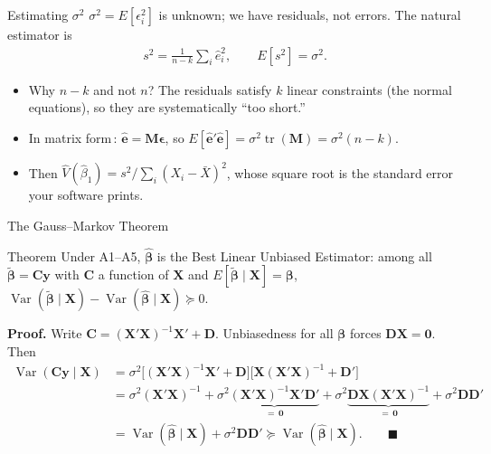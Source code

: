 \documentclass[aspectratio=169,11pt,xcolor=dvipsnames]{beamer}
\DeclareMathOperator{\Var}{Var}
\DeclareMathOperator{\trace}{tr}
\newcommand{\E}{E}
\newcommand{\X}{\bm{X}}
\newcommand{\Y}{\bm{y}}
\newcommand{\zero}{\bm{0}}
\newcommand{\Mm}{\bm{M}}
\newcommand{\bhat}{\hat{\bm{\beta}}}
\newcommand{\ehat}{\hat{\bm{e}}}
\newcommand{\adv}{\,\raisebox{0.6pt}{\textcolor{accent}{$\bigstar$}}}
\begin{document}
\begin{frame}{Estimating $\sigma^2$}
$\sigma^2 = \E[\epsilon_i^2]$ is unknown; we have residuals, not errors. The
natural estimator is
\begin{align*}
  s^2 = \frac{1}{n-k}\sum_i \hat e_i^2 ,
  \qquad \E[s^2] = \sigma^2 .
\end{align*}
\begin{itemize}\itemsep3pt
  \item Why $n-k$ and not $n$? The residuals satisfy $k$ linear constraints
        (the normal equations), so they are systematically ``too short.''
  \item In matrix form\adv: $\ehat = \Mm\bm\epsilon$, so
        $\E[\ehat'\ehat] = \sigma^2\trace(\Mm) = \sigma^2(n-k)$.
  \item Then $\hat{V}(\hat\beta_1) = s^2/\sum_i (X_i-\bar X)^2$, whose
        square root is the standard error your software prints.
\end{itemize}
\end{frame}

\begin{frame}{The Gauss--Markov Theorem\adv}
\begin{block}{Theorem}
Under A1--A5, $\bhat$ is the \alert{Best Linear Unbiased Estimator}: among all
$\tilde{\bm\beta} = \bm{C}\Y$ with $\bm C$ a function of $\X$ and
$\E[\tilde{\bm\beta}\mid\X]=\bm\beta$,
$\Var(\tilde{\bm\beta}\mid\X) - \Var(\bhat\mid\X) \succeq 0$.
\end{block}
\pause
\textbf{Proof.} Write $\bm{C} = (\X'\X)^{-1}\X' + \bm{D}$. Unbiasedness for all
$\bm\beta$ forces $\bm{D}\X = \zero$. Then
\begin{align*}
  \Var(\bm C\Y\mid\X)
  &= \sigma^2\big[(\X'\X)^{-1}\X' + \bm D\big]\big[\X(\X'\X)^{-1} + \bm D'\big] \\
  &= \sigma^2(\X'\X)^{-1}
   + \sigma^2\underbrace{(\X'\X)^{-1}\X'\bm D'}_{=\,\zero}
   + \sigma^2\underbrace{\bm D\X(\X'\X)^{-1}}_{=\,\zero}
   + \sigma^2\bm{D}\bm{D}' \\
  &= \Var(\bhat\mid\X) + \sigma^2\bm{D}\bm{D}' \succeq \Var(\bhat\mid\X) .
  \qquad\blacksquare
\end{align*}
\end{frame}
\end{document}
